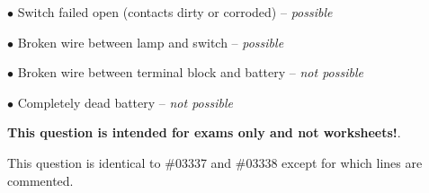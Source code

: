 \medskip
\item{$\bullet$} Switch failed open (contacts dirty or corroded) -- {\it possible} 
\item{$\bullet$} Broken wire between lamp and switch -- {\it possible}
\item{$\bullet$} Broken wire between terminal block and battery -- {\it not possible}
\item{$\bullet$} Completely dead battery -- {\it not possible}
\medskip







{\bf This question is intended for exams only and not worksheets!}.

This question is identical to \#03337 and \#03338 except for which lines are commented.



